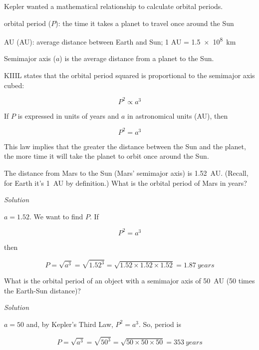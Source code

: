 \documentclass{article}
\begin{document}
Kepler wanted a mathematical relationship to calculate orbital periods.

orbital period ($P$): the time it takes a planet to travel once around the Sun

\gls{AU} (AU): average distance between Earth and Sun; 1 AU = \SI{1.5e8}{km}

Semimajor axis ($a$) is the average distance from a planet to the Sun.

\begin{mdframed}[backgroundcolor=black!10]
\gls{KIIIL} states that the orbital period squared is proportional to the semimajor axis cubed:
\vspace{-1em}

\begin{equation*}
    P^2 \propto a^3
\end{equation*}

If $P$ is expressed in units of years and $a$  in astronomical units (AU), then
\vspace{-1em}

\begin{equation*}
    P^2 = a^3
\end{equation*}

This law implies that the greater the distance between the Sun and the planet, the more time it will take the planet to orbit once around the Sun.
\end{mdframed}

\begin{example}
The distance from Mars to the Sun (Mars' semimajor axis) is \SI{1.52}{AU}. (Recall, for Earth it's \SI{1}{AU} by definition.) What is the orbital period of Mars in years?

\textit{Solution}

$a=1.52$. We want to find $P$. If

\begin{equation*}
    P^2 = a^3
\end{equation*}

then

\begin{equation*}
    P = \sqrt{a^3} = \sqrt{1.52^3} = \sqrt{1.52 \times 1.52 \times 1.52} = \SI{1.87}{years}
\end{equation*}
\end{example}

\begin{example}
What is the orbital period of an object with a semimajor axis of \SI{50}{AU} (50 times the Earth-Sun distance)?

\textit{Solution}

$a=50$ and, by Kepler's Third Law, $P^2 = a^3$. So, period is

\begin{equation*}
    P = \sqrt{a^3} = \sqrt{50^3} = \sqrt{50 \times 50 \times 50} = \SI{353}{years}
\end{equation*}
\end{example}
\end{document}
